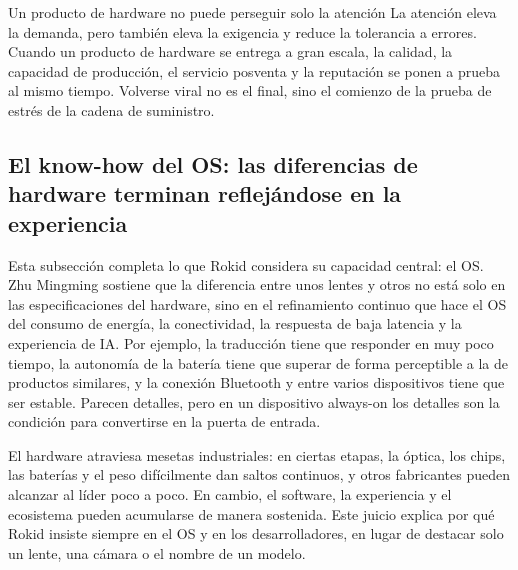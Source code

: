 \begin{importantbox}{Un producto de hardware no puede perseguir solo la atención}
La atención eleva la demanda, pero también eleva la exigencia y reduce la tolerancia a errores. Cuando un producto de hardware se entrega a gran escala, la calidad, la capacidad de producción, el servicio posventa y la reputación se ponen a prueba al mismo tiempo. Volverse viral no es el final, sino el comienzo de la prueba de estrés de la cadena de suministro.
\end{importantbox}

\subsection{El know-how del OS: las diferencias de hardware terminan reflejándose en la experiencia}

Esta subsección completa lo que Rokid considera su capacidad central: el OS. Zhu Mingming sostiene que la diferencia entre unos lentes y otros no está solo en las especificaciones del hardware, sino en el refinamiento continuo que hace el OS del consumo de energía, la conectividad, la respuesta de baja latencia y la experiencia de IA. Por ejemplo, la traducción tiene que responder en muy poco tiempo, la autonomía de la batería tiene que superar de forma perceptible a la de productos similares, y la conexión Bluetooth y entre varios dispositivos tiene que ser estable. Parecen detalles, pero en un dispositivo always-on los detalles son la condición para convertirse en la puerta de entrada.

El hardware atraviesa mesetas industriales: en ciertas etapas, la óptica, los chips, las baterías y el peso difícilmente dan saltos continuos, y otros fabricantes pueden alcanzar al líder poco a poco. En cambio, el software, la experiencia y el ecosistema pueden acumularse de manera sostenida. Este juicio explica por qué Rokid insiste siempre en el OS y en los desarrolladores, en lugar de destacar solo un lente, una cámara o el nombre de un modelo.

